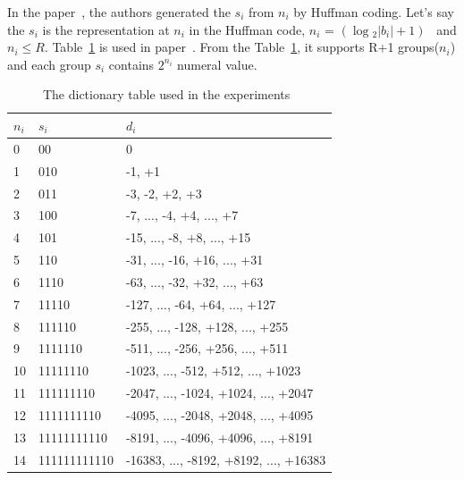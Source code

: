 In the paper~\cite{marcelloni2008simple}, the authors generated the $s_i$ from
$n_i$ by Huffman coding. Let's say the $s_i$ is the representation at $n_i$ in
the Huffman code, $n_i$ = $(\log{_2}{\left|{b_i}\right|} +
1)$~\cite{li2016temporal} and $n_i \leq R$. Table~\ref{table:LEC} is used in
paper~\cite{marcelloni2009efficient}. From the Table~\ref{table:LEC}, it
supports R+1 groups($n_i$) and each group $s_i$ contains $2^{n_i}$ numeral
value.  
\begin{table}[]
\begin{tabular}{|l|l|l|}
\hline
$n_i$ & $s_i$        & $d_i$                                  \\ \hline
0     & 00           & 0                                      \\ 
1     & 010          & -1, +1                                 \\
2     & 011          & -3, -2, +2, +3                         \\
3     & 100          & -7, ..., -4, +4, ..., +7               \\
4     & 101          & -15, ..., -8, +8, ..., +15             \\
5     & 110          & -31, ..., -16, +16, ..., +31           \\
6     & 1110         & -63, ..., -32, +32, ..., +63           \\
7     & 11110        & -127, ..., -64, +64, ..., +127         \\
8     & 111110       & -255, ..., -128, +128, ..., +255       \\
9     & 1111110      & -511, ..., -256, +256, ..., +511       \\
10    & 11111110     & -1023, ..., -512, +512, ..., +1023     \\
11    & 111111110    & -2047, ..., -1024, +1024, ..., +2047   \\
12    & 1111111110   & -4095, ..., -2048, +2048, ..., +4095   \\
13    & 11111111110  & -8191, ..., -4096, +4096, ..., +8191   \\
14    & 111111111110 & -16383, ..., -8192, +8192, ..., +16383 \\
\hline
\end{tabular}
\caption{The dictionary table used in the experiments~\cite{marcelloni2009efficient}}
\label{table:LEC}
\end{table}
 

